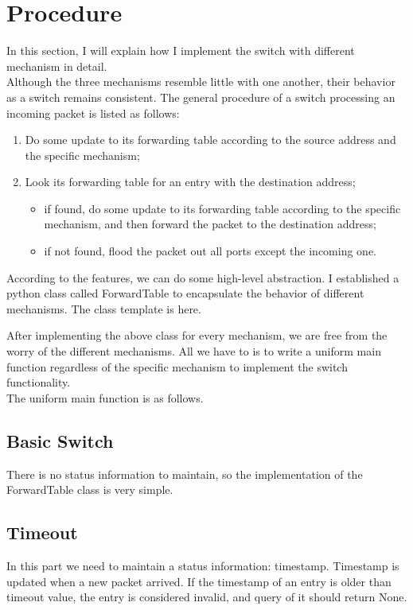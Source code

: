 \documentclass[12pt,a4paper,UTF8]{article}
\begin{document}
\section{Procedure}
In this section, I will explain how I implement the switch with different mechanism in detail. \\
Although the three mechanisms resemble little with one another, their behavior as a switch remains consistent. The general procedure of a switch processing an incoming packet is listed as follows:
\begin{enumerate}
	\item Do some update to its forwarding table according to the source address and the specific mechanism;
	\item Look its forwarding table for an entry with the destination address;
	\begin{itemize}
		\item if found, do some update to its forwarding table according to the specific mechanism, and then forward the packet to the destination address;
		\item if not found, flood the packet out all ports except the incoming one.
	\end{itemize}
\end{enumerate}
According to the features, we can do some high-level abstraction. I established a python class called ForwardTable to encapsulate the behavior of different mechanisms. The class template is here.


After implementing the above class for every mechanism, we are free from the worry of the different mechanisms. All we have to is to write a uniform main function regardless of the specific mechanism to implement the switch functionality.
\\ The uniform main function is as follows.


\subsection{Basic Switch}
There is no status information to maintain, so the implementation of the ForwardTable class is very simple.


\subsection{Timeout}
In this part we need to maintain a status information: timestamp. Timestamp is updated when a new packet arrived. If the timestamp of an entry is older than timeout value, the entry is considered invalid, and query of it should return None.

\end{document}
